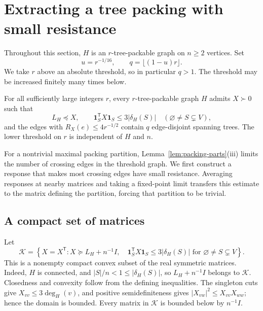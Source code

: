 \section{Extracting a tree packing with small resistance}
\label{sec:extraction}

Throughout this section, \(H\) is an \(r\)-tree-packable graph on
\(n\ge2\) vertices. Set
\begin{equation}\label{eq:parameters}
 u=r^{-1/16},\qquad q=\lfloor(1-u)r\rfloor.
\end{equation}
We take \(r\) above an absolute threshold, so in particular \(q>1\).
The threshold may be increased finitely many times below.

\begin{theorem}\label{thm:extraction}
For all sufficiently large integers \(r\), every \(r\)-tree-packable
graph \(H\) admits \(X\succ0\) such that
\begin{equation}\label{eq:shortcut-X}
 L_H\preceq X,\qquad
 \mathbf1_S^{\mathsf T}X\mathbf1_S\le3|\delta_H(S)|
 \quad(\varnothing\ne S\subsetneq V),
\end{equation}
and the edges with \(R_X(e)\le4r^{-1/2}\) contain \(q\)
edge-disjoint spanning trees. The lower threshold on \(r\) is
independent of \(H\) and \(n\).
\end{theorem}

For a nontrivial maximal packing partition,
Lemma~\ref{lem:packing-parts}(iii) limits the number of crossing edges
in the threshold graph. We first construct
a response that makes most crossing edges have small resistance.
Averaging responses at nearby matrices and taking a fixed-point limit transfers
this estimate to the matrix defining the partition, forcing that
partition to be trivial.

\subsection{A compact set of matrices}

Let
\begin{equation}\label{eq:compact-domain}
 \mathcal K=
 \left\{X=X^{\mathsf T}:
 X\succeq L_H+n^{-1}I,\quad
 \mathbf1_S^{\mathsf T}X\mathbf1_S\le3|\delta_H(S)|
 \text{ for }\varnothing\ne S\subsetneq V\right\}.
\end{equation}
This is a nonempty compact convex subset of the real symmetric
matrices. Indeed, \(H\) is connected, and
\(|S|/n<1\le|\delta_H(S)|\), so \(L_H+n^{-1}I\) belongs to
\(\mathcal K\). Closedness and convexity follow from the defining
inequalities. The singleton cuts give
\(X_{vv}\le3\deg_H(v)\), and positive semidefiniteness gives
\(|X_{vw}|^2\le X_{vv}X_{ww}\); hence the domain is bounded.
Every matrix in \(\mathcal K\) is bounded below by \(n^{-1}I\).

